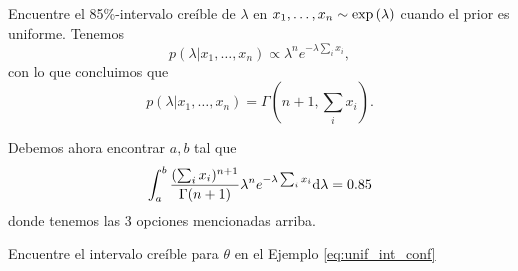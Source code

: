 \begin{example} Encuentre el 85\%-intervalo creíble de $\lambda$ en $x_1,\ldots, x_n\sim \exp\left(\lambda\right)$ cuando el prior es uniforme. Tenemos 
\begin{equation}
    p(\lambda|x_1,\ldots, x_n) \propto \lambda^ne^{-\lambda\sum_i x_i},
\end{equation}
con lo que concluimos que
\begin{equation}
p(\lambda|x_1,\ldots, x_n) = \Gamma(n+1,\sum_i x_i).
\end{equation}

Debemos ahora encontrar $a,b$ tal que 
\begin{equation}
    \int_a^b \frac{(\sum_i x_i)^{n+1}}{\Gamma(n+1)}\lambda^ne^{-\lambda\sum_i x_i}{\text{d}}\lambda = 0.85
\end{equation}
donde tenemos las 3 opciones mencionadas arriba.
\end{example}

\begin{exercise} Encuentre el intervalo creíble para $\theta$ en el Ejemplo \ref{eq:unif_int_conf}
\end{exercise}





